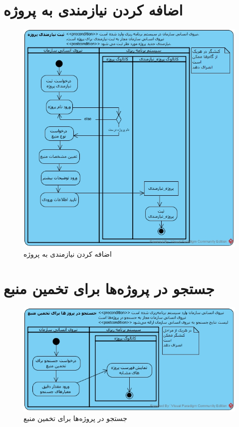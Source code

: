 \section{اضافه کردن نیازمندی به پروژه}
\begin{figure}[H]
	\centering
	\includegraphics[scale=0.7]{img/activity/AddRequirementToProject}
	\caption{اضافه کردن نیازمندی به پروژه}
\end{figure}

\section{جستجو در پروژه‌ها برای تخمین منبع}
\begin{figure}[H]
	\centering
	\includegraphics[scale=0.8]{img/activity/SearchInProjects}
	\caption{جستجو در پروژه‌ها برای تخمین منبع}
\end{figure}


